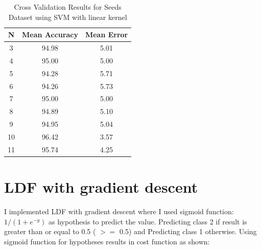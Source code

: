 \documentclass[11pt, pdftex]{article}
\begin{document}
\begin{table}
\centering
\begin{tabular}{ | c | c | c |}
    \hline
    {\bf N} & {\bf Mean Accuracy} & {\bf Mean Error}\\ 
    \hline
    3 & 94.98 & 5.01\\
	\hline
	4 & 95.00 & 5.00\\
	\hline
	5 & 94.28 & 5.71\\
	\hline
	6 & 94.26 & 5.73\\
	\hline
	7 & 95.00 & 5.00\\
	\hline
	8 & 94.89 & 5.10\\
	\hline
	9 & 94.95 & 5.04\\
	\hline
	10 & 96.42 & 3.57\\
	\hline
	11 & 95.74 & 4.25\\
	\hline
	\end{tabular}
	\caption{Cross Validation Results for Seeds Dataset using SVM with linear kernel}
    \label{tab:svmcv}
\end{table}
\section{LDF with gradient descent}
I implemented LDF with gradient descent where I used sigmoid function:$1/(1+e^{-y})$ as hypothesis to predict the value. Predicting class 2 if result is greater than or equal to 0.5 ( $>=$ 0.5) and Predicting class 1 otherwise. Using sigmoid function for hypotheses results in cost function as shown:
\end{document}
